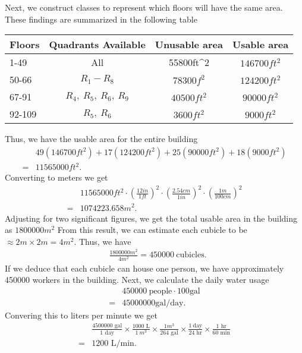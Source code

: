 \documentclass{report}
\begin{document}
    \pagebreak \bigbreak \noindent 
    Next, we construct classes to represent which floors will have the same area. These findings are summarized in the following table
    \bigbreak \noindent 
    \begin{center}
        \begin{center}
            \begin{tabular}{l|c|c|c}
            Floors & Quadrants Available & Unusable area &Usable area \\
            	\hline
            1-49 & All & 55800ft^{2} & $146700ft^{2}$  \\
            50-66 & $R_{1} - R_{8}$ & $78300f^{2}$&  $124200ft^{2}$\\
            67-91 & $R_{4},\ R_{5},\ R_{6},\ R_{9}$& $40500ft^{2}$ & $90000ft^{2}$ \\
            92-109 & $R_{5},\ R_{6} $ &$3600ft^{2}$ &$9000ft^{2} $
            \end{tabular}
        \end{center}
    \end{center}
    \bigbreak \noindent 
    Thus, we have the usable area for the entire building
    \begin{align*}
        &49(146700ft^{2}) + 17(124200ft^{2}) + 25(90000ft^{2}) + 18(9000ft^{2}) \\
        =&11565000ft^{2}
    .\end{align*}
    Converting to meters we get
    \begin{align*}
        &11565000ft^{2} \cdot \left(\frac{12in}{1ft}\right)^{2} \cdot \left(\frac{2.54cm}{1in}\right)^{2} \cdot \left(\frac{1m}{100cm}\right)^{2} \\ 
        =&1074223.658m^{2}
    .\end{align*}
    Adjusting for two significant figures, we get the total usable area in the building as $1800000m^{2}$
    \bigbreak \noindent 
    From this result, we can estimate each cubicle to be $\approx 2m \times 2m = 4m^{2}$. Thus, we have
    \begin{align*}
        &\frac{1800000m^{2}}{4m^{2}} =450000\ \text{cubicles}
    .\end{align*}
    If we deduce that each cubicle can house one person, we have approximately 450000 workers in the building.
    \bigbreak \noindent 
    Next, we calculate the daily water usage
    \begin{align*}
        &450000\ \text{people} \cdot 100\text{gal} \\
        =&45000000 \text{gal}/\text{day}
    .\end{align*}
    Convering this to liters per minute we get
    \begin{align*}
        &\frac{4500000 \text{ gal}}{\text{1 day}} \times \frac{1000 \text{ L}}{1\ m^{3}}\times \frac{1m^{3}}{264 \text{ gal}}  \times \frac{1\ \text{day}}{24 \text{ hr}} \times \frac{1 \text{ hr}}{60 \text{ min}} \\
        =&1200 \text{ L}/\text{min}
    .\end{align*}
\end{document}
